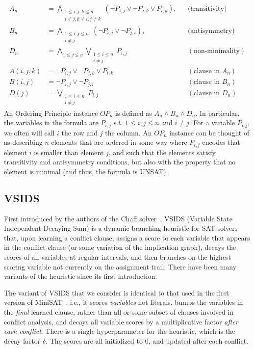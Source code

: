 \documentclass[a4paper,UKenglish,cleveref, autoref, thm-restate]{lipics-v2021}
\begin{document}
\begin{align*}
A_n &= \bigwedge_{\substack{1 \le i,j,k \le n \\ i \ne j, k \ne i, j \ne k}} (\neg P_{i,j} \lor \neg P_{j,k} \lor P_{i,k}), &&(\text{transitivity)}\\
%
B_n &= \bigwedge_{\substack{1 \le i,j \le n \\ i \ne j}} (\neg P_{i,j} \lor \neg P_{j,i}), && \text{(antisymmetry)}\\
%
D_n &= \bigwedge_{1 \le j \le n} \bigvee_{\substack{1 \le i \le n \\ i \ne j}} P_{i,j} && (\text{non-minimality})\\
%
A(i, j, k) &= \neg P_{i,j} \lor \neg P_{j,k} \lor P_{i,k} && (\text{clause in $A_n$})\\
%
B(i, j) &= \neg P_{i,j} \lor \neg P_{j,i} && (\text{clause in $B_n$})\\
%
D(j) &= \bigvee_{\substack{1 \le i \le n \\ i \ne j}} P_{i,j} && (\text{clause in $D_n$})
\end{align*}
\noindent An Ordering Principle instance $OP_n$ is defined as $A_n \land B_n \land D_n$. In particular, the variables in the formula are $P_{i, j}$ s.t. $1 \leq i, j \leq n$ and $i \neq j$. For a variable $P_{i, j}$, we often will call $i$ the row and $j$ the column. An $OP_n$ instance can be thought of as describing $n$ elements that are ordered in some way where $P_{i, j}$ encodes that element $i$ is smaller than element $j$, and such that the elements satisfy transitivity and antisymmetry conditions, but also with the property that no element is minimal (and thus, the formula is UNSAT).

\subsection{VSIDS}

First introduced by the authors of the Chaff solver~\cite{chaff}, VSIDS (Variable State Independent Decaying Sum) is a dynamic branching heuristic for SAT solvers that, upon learning a conflict clause, assigns a score to each variable that appears in the conflict clause (or some variation of the implication graph), decays the scores of all variables at regular intervals, and then branches on the highest scoring variable not currently on the assignment trail. There have been many variants of the heuristic since its first introduction. 

The variant of VSIDS that we consider is identical to that used in the first version of MiniSAT~\cite{minisat}, i.e., it scores \textit{variables} not literals, bumps the variables in the \textit{final} learned clause, rather than all or some subset of clauses involved in conflict analysis, and decays all variable scores by a multiplicative factor \textit{after each conflict}. There is a single hyperparameter for the heuristic, which is the decay factor $\delta$. The scores are all initialized to $0$, and updated after each conflict. 
\end{document}
